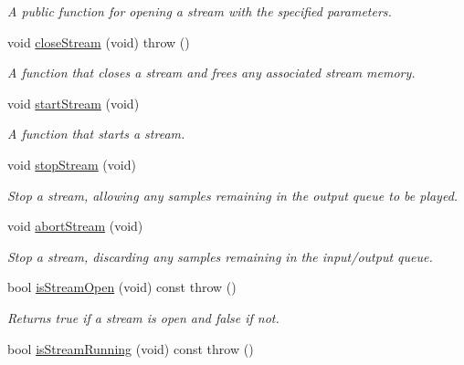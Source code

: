 \begin{DoxyCompactItemize}
\begin{DoxyCompactList}\small\item\em A public function for opening a stream with the specified parameters. \end{DoxyCompactList}\item 
void \hyperlink{class_rt_audio_a90d599002ad32cf250a4cb866f2cc93a}{close\+Stream} (void)  throw ()
\begin{DoxyCompactList}\small\item\em A function that closes a stream and frees any associated stream memory. \end{DoxyCompactList}\item 
void \hyperlink{class_rt_audio_aec017a89629ccef66a90b60be22a2f80}{start\+Stream} (void)
\begin{DoxyCompactList}\small\item\em A function that starts a stream. \end{DoxyCompactList}\item 
void \hyperlink{class_rt_audio_af4c241ff86936ecc8108f0d9dfe3efdd}{stop\+Stream} (void)
\begin{DoxyCompactList}\small\item\em Stop a stream, allowing any samples remaining in the output queue to be played. \end{DoxyCompactList}\item 
void \hyperlink{class_rt_audio_ad0586b47cd6bb9591a80b4052815991f}{abort\+Stream} (void)
\begin{DoxyCompactList}\small\item\em Stop a stream, discarding any samples remaining in the input/output queue. \end{DoxyCompactList}\item 
bool \hyperlink{class_rt_audio_a3863e45ff81dbe97176de0ee7545917f}{is\+Stream\+Open} (void) const   throw ()\hypertarget{class_rt_audio_a3863e45ff81dbe97176de0ee7545917f}{}\label{class_rt_audio_a3863e45ff81dbe97176de0ee7545917f}

\begin{DoxyCompactList}\small\item\em Returns true if a stream is open and false if not. \end{DoxyCompactList}\item 
bool \hyperlink{class_rt_audio_a84cc8d9b7ab9bc5f37bcf48430ec5aea}{is\+Stream\+Running} (void) const   throw ()\hypertarget{class_rt_audio_a84cc8d9b7ab9bc5f37bcf48430ec5aea}{}\label{class_rt_audio_a84cc8d9b7ab9bc5f37bcf48430ec5aea}


\end{DoxyCompactItemize}
